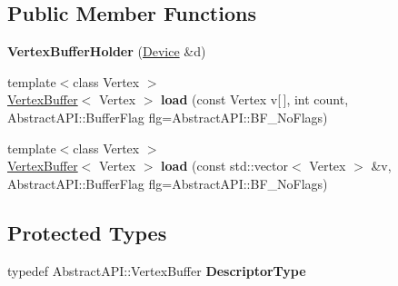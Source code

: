 \subsection*{Public Member Functions}
\begin{DoxyCompactItemize}
\item 
\hypertarget{class_tempest_1_1_vertex_buffer_holder_ac844804a266f2e5ea320b35766c92104}{{\bfseries Vertex\+Buffer\+Holder} (\hyperlink{class_tempest_1_1_device}{Device} \&d)}\label{class_tempest_1_1_vertex_buffer_holder_ac844804a266f2e5ea320b35766c92104}

\item 
\hypertarget{class_tempest_1_1_vertex_buffer_holder_a0bce66d35a37bbb26695ec6288744e2e}{{\footnotesize template$<$class Vertex $>$ }\\\hyperlink{class_tempest_1_1_vertex_buffer}{Vertex\+Buffer}$<$ Vertex $>$ {\bfseries load} (const Vertex v\mbox{[}$\,$\mbox{]}, int count, Abstract\+A\+P\+I\+::\+Buffer\+Flag flg=Abstract\+A\+P\+I\+::\+B\+F\+\_\+\+No\+Flags)}\label{class_tempest_1_1_vertex_buffer_holder_a0bce66d35a37bbb26695ec6288744e2e}

\item 
\hypertarget{class_tempest_1_1_vertex_buffer_holder_a92f07c890f8add70ca014dc4d9bc2535}{{\footnotesize template$<$class Vertex $>$ }\\\hyperlink{class_tempest_1_1_vertex_buffer}{Vertex\+Buffer}$<$ Vertex $>$ {\bfseries load} (const std\+::vector$<$ Vertex $>$ \&v, Abstract\+A\+P\+I\+::\+Buffer\+Flag flg=Abstract\+A\+P\+I\+::\+B\+F\+\_\+\+No\+Flags)}\label{class_tempest_1_1_vertex_buffer_holder_a92f07c890f8add70ca014dc4d9bc2535}

\end{DoxyCompactItemize}
\subsection*{Protected Types}
\begin{DoxyCompactItemize}
\item 
\hypertarget{class_tempest_1_1_vertex_buffer_holder_a7cbfb56291996dc68f0dface6f747268}{typedef Abstract\+A\+P\+I\+::\+Vertex\+Buffer {\bfseries Descriptor\+Type}}\label{class_tempest_1_1_vertex_buffer_holder_a7cbfb56291996dc68f0dface6f747268}

\end{DoxyCompactItemize}
